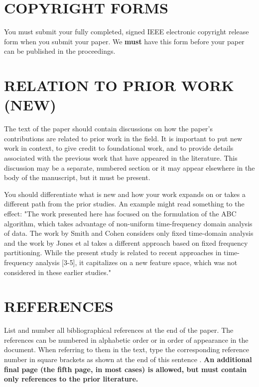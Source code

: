 \documentclass{article}
\begin{document}

\section{COPYRIGHT FORMS}
\label{sec:copyright}

You must submit your fully completed, signed IEEE electronic copyright release
form when you submit your paper. We {\bf must} have this form before your paper
can be published in the proceedings.

\section{RELATION TO PRIOR WORK (NEW)}
\label{sec:prior}

The text of the paper should contain discussions on how the paper's
contributions are related to prior work in the field. It is important
to put new work in  context, to give credit to foundational work, and
to provide details associated with the previous work that have appeared
in the literature. This discussion may be a separate, numbered section
or it may appear elsewhere in the body of the manuscript, but it must
be present.

You should differentiate what is new and how your work expands on
or takes a different path from the prior studies. An example might
read something to the effect: "The work presented here has focused
on the formulation of the ABC algorithm, which takes advantage of
non-uniform time-frequency domain analysis of data. The work by
Smith and Cohen \cite{Lamp86} considers only fixed time-domain analysis and
the work by Jones et al \cite{C2} takes a different approach based on
fixed frequency partitioning. While the present study is related
to recent approaches in time-frequency analysis [3-5], it capitalizes
on a new feature space, which was not considered in these earlier
studies."

\vfill\pagebreak

\section{REFERENCES}
\label{sec:refs}

List and number all bibliographical references at the end of the
paper. The references can be numbered in alphabetic order or in
order of appearance in the document. When referring to them in the
text, type the corresponding reference number in square brackets
as shown at the end of this sentence \cite{C2}. \textbf{An
additional final page (the fifth page, in most cases) is allowed,
but must contain only references to the prior literature.}



\end{document}

